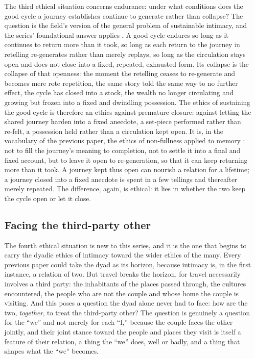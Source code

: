 The third ethical situation concerns endurance: under what conditions does the good cycle a journey establishes continue to generate rather than collapse? The question is the field's version of the general problem of sustainable intimacy, and the series' foundational answer applies \parencite{paperix}. A good cycle endures so long as it continues to return more than it took, so long as each return to the journey in retelling re-generates rather than merely replays, so long as the circulation stays open and does not close into a fixed, repeated, exhausted form. Its collapse is the collapse of that openness: the moment the retelling ceases to re-generate and becomes mere rote repetition, the same story told the same way to no further effect, the cycle has closed into a stock, the wealth no longer circulating and growing but frozen into a fixed and dwindling possession. The ethics of sustaining the good cycle is therefore an ethics against premature closure: against letting the shared journey harden into a fixed anecdote, a set-piece performed rather than re-felt, a possession held rather than a circulation kept open. It is, in the vocabulary of the previous paper, the ethics of non-fullness applied to memory \parencite{paperxx}: not to fill the journey's meaning to completion, not to settle it into a final and fixed account, but to leave it open to re-generation, so that it can keep returning more than it took. A journey kept thus open can nourish a relation for a lifetime; a journey closed into a fixed anecdote is spent in a few tellings and thereafter merely repeated. The difference, again, is ethical: it lies in whether the two keep the cycle open or let it close.

\subsection{Facing the third-party other}
\label{p21:sub:ethics-thirdparty}

The fourth ethical situation is new to this series, and it is the one that begins to carry the dyadic ethics of intimacy toward the wider ethics of the many. Every previous paper could take the dyad as its horizon, because intimacy is, in the first instance, a relation of two. But travel breaks the horizon, for travel necessarily involves a third party: the inhabitants of the places passed through, the cultures encountered, the people who are not the couple and whose home the couple is visiting. And this poses a question the dyad alone never had to face: how are the two, \emph{together}, to treat the third-party other? The question is genuinely a question for the ``we'' and not merely for each ``I,'' because the couple faces the other jointly, and their joint stance toward the people and places they visit is itself a feature of their relation, a thing the ``we'' does, well or badly, and a thing that shapes what the ``we'' becomes.

